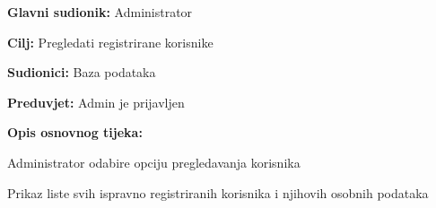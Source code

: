					\noindent {}
					\begin{packed_item}
	
						\item \textbf{Glavni sudionik: }  Administrator
						\item  \textbf{Cilj:} Pregledati registrirane korisnike
						\item  \textbf{Sudionici:} Baza podataka
						\item  \textbf{Preduvjet:} Admin je prijavljen
						\item  \textbf{Opis osnovnog tijeka:} 
						
						
						\item[] \begin{packed_enum}
	
							\item Administrator odabire opciju pregledavanja korisnika 						
							\item Prikaz liste svih ispravno registriranih korisnika i njihovih osobnih podataka
							
						\end{packed_enum}
					\end{packed_item}
					\noindent {}
